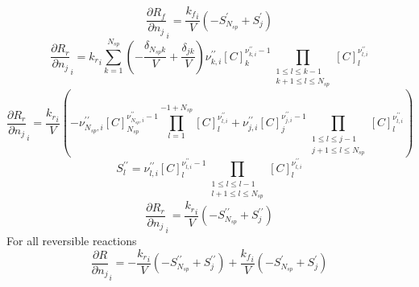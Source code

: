 \documentclass[a4paper,10pt]{article}
\newcommand{\ns}{N_{sp}}
\begin{document}
\begin{dmath} \frac{\partial {R_f} }{\partial {n_j} }_{i} = \frac{{k_f}_{i}}{V} \left(- S^{\prime}_{\ns} + S^{\prime}_{j}\right)\end{dmath} 
\begin{dmath} \frac{\partial {R_r} }{\partial {n_j} }_{i} = {k_r}_{i} \sum_{k=1}^{\ns} \left(- \frac{\delta_{\ns k}}{V} + \frac{\delta_{j k}}{V}\right) \nu^{\prime\prime}_{k,i} [C]_{k}^{\nu^{\prime\prime}_{k,i} - 1} \prod_{\substack{1 \leq l \leq k - 1\\k + 1 \leq l \leq \ns}} [C]_{l}^{\nu^{\prime\prime}_{l,i}}\end{dmath} 
\begin{dmath} \frac{\partial {R_r} }{\partial {n_j} }_{i} = \frac{{k_r}_{i}}{V} \left(- \nu^{\prime\prime}_{\ns,i} [C]_{\ns}^{\nu^{\prime\prime}_{\ns,i} - 1} \prod_{l=1}^{-1 + \ns} [C]_{l}^{\nu^{\prime\prime}_{l,i}} + \nu^{\prime\prime}_{j,i} [C]_{j}^{\nu^{\prime\prime}_{j,i} - 1} \prod_{\substack{1 \leq l \leq j - 1\\j + 1 \leq l \leq \ns}} [C]_{l}^{\nu^{\prime\prime}_{l,i}}\right)\end{dmath} 
\begin{dmath} S^{\prime\prime}_{l} = \nu^{\prime\prime}_{l,i} [C]_{l}^{\nu^{\prime\prime}_{l,i} - 1} \prod_{\substack{1 \leq l \leq l - 1\\l + 1 \leq l \leq \ns}} [C]_{l}^{\nu^{\prime\prime}_{l,i}}\end{dmath} 
\begin{dmath} \frac{\partial {R_r} }{\partial {n_j} }_{i} = \frac{{k_r}_{i}}{V} \left(- S^{\prime\prime}_{\ns} + S^{\prime\prime}_{j}\right)\end{dmath} 
For all reversible reactions
\begin{dmath} \frac{\partial R }{\partial {n_j} }_{i} = - \frac{{k_r}_{i}}{V} \left(- S^{\prime\prime}_{\ns} + S^{\prime\prime}_{j}\right) + \frac{{k_f}_{i}}{V} \left(- S^{\prime}_{\ns} + S^{\prime}_{j}\right)\end{dmath} 
\end{document}
